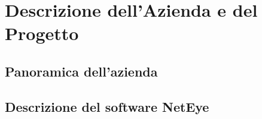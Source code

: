 \chapter{Descrizione dell'Azienda e del Progetto}
\label{cha:azienda_progetto}

\section{Panoramica dell'azienda}
\label{sec:panoramica}

\lipsum[1]

\section{Descrizione del software NetEye}
\label{sec:neteye}

\lipsum[1]